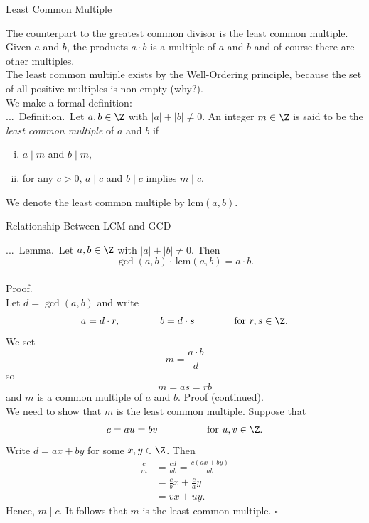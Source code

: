 \documentclass[smaller,hyperref={CJKbookmarks=true}]{beamer}
\newenvironment{PROOF}{{\noindent\!\sf\alert{Proof.}}\\}{\hfill$\square$\\}
\newcounter{zhuo}[subsection]
\renewcommand{\thezhuo}{\thesection.\thesubsection.\arabic{zhuo}}
\newenvironment{DEFINITION}{\stepcounter{zhuo}\alert{\thezhuo.~Definition.\,}}{}
\newenvironment{LEMMA}{\stepcounter{zhuo}\alert{\thezhuo.~Lemma.\,}}{}
\begin{document}
\begin{frame}[c]{Least Common Multiple}
\begin{spacing}{1.1}
The counterpart to the greatest common divisor is the least common
multiple. Given $a$ and $b$, the products $a\cdot b$ is a multiple of $a$ and $b$ and of
course there are other multiples.\\[5pt]
The least common multiple exists by the Well-Ordering principle, because
the set of all positive multiples is non-empty (why?).\\[5pt]
We make a formal definition:\\[3pt]
\begin{DEFINITION}
Let $a,b\in\Z$ with $|a|+|b|\neq0$. An integer $m\in\Z$ is said to be the \emph{least common multiple} of $a$ and $b$ if
\begin{enumerate}[(i)]
  \item $a\mid m$ and $b\mid m$,
  \item for any $c>0,\,a\mid c$ and $b\mid c$ implies $m\mid c$.
\end{enumerate}
We denote the least common multiple by $\text{lcm}(a,b)$.
\end{DEFINITION}
\end{spacing}
\end{frame}
\begin{frame}{Relationship Between LCM and GCD}
\begin{spacing}{1.1}
\begin{LEMMA}
Let $a,b\in\Z$ with $|a|+|b|\neq0$. Then
\[\gcd(a,b)\cdot\,\text{lcm}(a,b)=a\cdot b.\]
\end{LEMMA}\\[3pt]
\begin{PROOF}
Let $d=\gcd(a,b)$ and write
\[a=d\cdot r,\qquad\qquad b=d\cdot s\qquad\qquad\text{for}~r,s\in\Z.\]
We set
\[m=\frac{a\cdot b}{d}\]
so
\[m=as=rb\]
and $m$ is a common multiple of $a$ and $b$.
\newpage
\vspace*{9pt}
\alert{Proof (continued).}\\[3pt]
We need to show that $m$ is the least common multiple. Suppose that
\[c=au=bv\qquad\qquad\quad\text{for}~u,v\in\Z.\]
Write $d=ax+by$ for some $x,y\in\Z$. Then
\begin{equation*}
  \begin{split}
     \frac{c}{m} &=\frac{cd}{ab}=\frac{c(ax+by)}{ab} \\
       &=\frac{c}{b}x+\frac{c}{a}y \\
       &=vx+uy.
  \end{split}
\end{equation*}
Hence, $m\mid c$. It follows that $m$ is the least common multiple.
\end{PROOF}
\end{spacing}
\end{frame}
\end{document}
